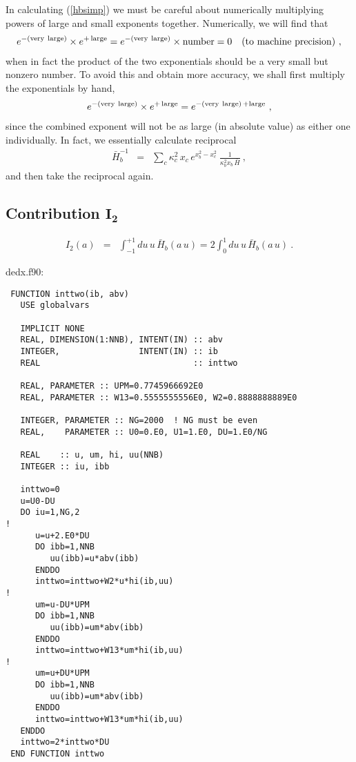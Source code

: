 \documentclass[preprint,12pt,eqsecnum,nofootinbib,amsmath,amssymb]{revtex4}
\begin{document}
\vskip0.2cm
\noindent
In calculating (\ref{hbsimp}) we must be careful about
numerically multiplying powers of large and small 
exponents together. Numerically, we will find that
\begin{eqnarray}
 e^{-({\rm very~large})} \times e^{+\, {\rm large}} =
 e^{-({\rm very~large})} \times {\rm number} = 0
 ~~~({\rm to~machine~precision}) \ ,
\end{eqnarray}
when in fact the product of the two exponentials should
be a very small but nonzero number. To avoid this and
obtain more accuracy, we shall first multiply the
exponentials by hand,
\begin{eqnarray}
 e^{-({\rm very~large})} \times e^{+\, {\rm large}}=
 e^{-({\rm very~large})\,+{\rm large}} \ ,
\end{eqnarray}
since the combined exponent will not be as large 
(in absolute value) as either one individually.
In fact, we essentially calculate reciprocal
\begin{eqnarray}
  \bar H_b^{-1} &=& 
  \sum_c \kappa_c^2\, x_c\,e^{x_b^2-x_c^2}~
  \frac{1}{\kappa_b^2 x_b\, \bar H} \ ,
\end{eqnarray}
and then take the reciprocal again. 


\subsection{Contribution $\bm{I_2}$}

\begin{eqnarray}
  I_2(a) &=&
  \int_{-1}^{+1} du \, u \,\bar H_b(a \,u) =
  2 \int_0^1 du \, u \,\bar H_b(a \,u)  \ .
\end{eqnarray}


{
\noindent
dedx.f90:
\baselineskip12pt
\begin{verbatim}
 FUNCTION inttwo(ib, abv)
   USE globalvars
    
   IMPLICIT NONE     
   REAL, DIMENSION(1:NNB), INTENT(IN) :: abv
   INTEGER,                INTENT(IN) :: ib
   REAL                               :: inttwo
   
   REAL, PARAMETER :: UPM=0.7745966692E0
   REAL, PARAMETER :: W13=0.5555555556E0, W2=0.8888888889E0
   
   INTEGER, PARAMETER :: NG=2000  ! NG must be even
   REAL,    PARAMETER :: U0=0.E0, U1=1.E0, DU=1.E0/NG
   
   REAL    :: u, um, hi, uu(NNB)
   INTEGER :: iu, ibb
   
   inttwo=0
   u=U0-DU
   DO iu=1,NG,2
!
      u=u+2.E0*DU
      DO ibb=1,NNB
         uu(ibb)=u*abv(ibb)
      ENDDO
      inttwo=inttwo+W2*u*hi(ib,uu)
!
      um=u-DU*UPM
      DO ibb=1,NNB
         uu(ibb)=um*abv(ibb)
      ENDDO
      inttwo=inttwo+W13*um*hi(ib,uu)
!
      um=u+DU*UPM
      DO ibb=1,NNB
         uu(ibb)=um*abv(ibb)
      ENDDO
      inttwo=inttwo+W13*um*hi(ib,uu)
   ENDDO
   inttwo=2*inttwo*DU
 END FUNCTION inttwo
\end{verbatim}
}
\end{document}
